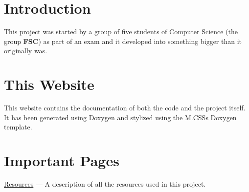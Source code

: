 \hypertarget{index_intro_sec}{}\section{Introduction}\label{index_intro_sec}
This project was started by a group of five students of Computer Science (the group {\bfseries{F\+SC}}) as part of an exam and it developed into something bigger than it originally was.\hypertarget{index_the_website}{}\section{This Website}\label{index_the_website}
This website contains the documentation of both the code and the project itself. It has been generated using Doxygen and stylized using the M.\+C\+SS\textquotesingle{}s Doxygen template.\hypertarget{index_important_pages}{}\section{Important Pages}\label{index_important_pages}
\mbox{\hyperlink{resources}{Resources}} --- A description of all the resources used in this project. 